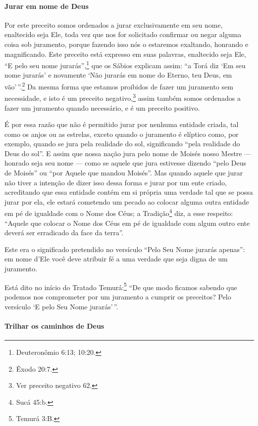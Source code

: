 \begin{multicols}{2}
\paragraph{Jurar em nome de Deus}

Por este preceito somos ordenados a jurar exclusivamente em seu nome,
enaltecido seja Ele, toda vez que nos for solicitado confirmar ou negar
alguma coisa sob juramento, porque fazendo isso nós o estaremos
exaltando, honrando e magnificando. Este preceito está expresso em suas
palavras, enaltecido seja Ele, ``E pelo seu nome jurarás'',\footnote{Deuteronômio 6:13; 10:20.} que os Sábios explicam assim: ``a Torá\starr{} diz
`Em seu nome jurarás' e novamente `Não jurarás em nome do Eterno, teu
Deus, em vão'\,''.\footnote{Êxodo 20:7.} Da mesma forma que estamos proibidos de
fazer um juramento sem necessidade, e isto é um preceito
negativo,\footnote{Ver preceito negativo 62.} assim também somos ordenados a fazer um juramento quando necessário, e é um preceito positivo.

É por essa razão que não é permitido jurar por nenhuma entidade criada,
tal como os anjos ou as estrelas, exceto quando o juramento é elíptico
como, por exemplo, quando se jura pela realidade do sol, significando
``pela realidade do Deus do sol''. E assim que nossa nação jura pelo
nome de Moisés nosso Mestre --- honrado seja seu nome --- como se aquele
que jura estivesse dizendo ``pelo Deus de Moisés'' ou ``por Aquele que
mandou Moisés''. Mas quando aquele que jurar não tiver a intenção de
dizer isso dessa forma e jurar por um ente criado, acreditando que essa
entidade contém em si própria uma verdade tal que se possa jurar por
ela, ele estará cometendo um pecado ao colocar alguma outra entidade em
pé de igualdade com o Nome dos Céus; a Tradição\footnote{Sucá\starr{} 45:b.}
diz, a esse respeito: ``Aquele que colocar o Nome dos Céus em pé de
igualdade com algum outro ente deverá ser erradicado da face da terra''.

Este era o significado pretendido no versículo ``Pelo Seu Nome jurarás
apenas'': em nome d'Ele você deve atribuir fé a uma verdade que seja
digna de um juramento.

Está dito no início do Tratado Temurá\starr:\footnote{Temurá\starr{} 3:B.} ``De que
modo ficamos sabendo que podemos nos comprometer por um juramento a cumprir os preceitos? Pelo versículo `E pelo Seu Nome jurarás'\,''.

\paragraph{Trilhar os caminhos de Deus}


\end{multicols}
